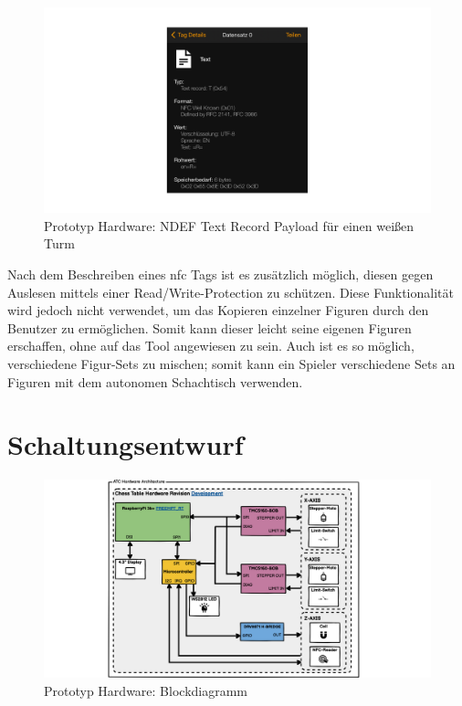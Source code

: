 \begin{figure}
\centering
\includegraphics{images/ndef_record_rook.png}
\caption{Prototyp Hardware: NDEF Text Record Payload für einen weißen
Turm \label{ndef_record_rook}}
\end{figure}

Nach dem Beschreiben eines \gls{nfc} Tags ist es zusätzlich möglich,
diesen gegen Auslesen mittels einer Read/Write-Protection zu schützen.
Diese Funktionalität wird jedoch nicht verwendet, um das Kopieren
einzelner Figuren durch den Benutzer zu ermöglichen. Somit kann dieser
leicht seine eigenen Figuren erschaffen, ohne auf das Tool angewiesen zu
sein. Auch ist es so möglich, verschiedene Figur-Sets zu mischen; somit
kann ein Spieler verschiedene Sets an Figuren mit dem autonomen
Schachtisch verwenden.

\hypertarget{schaltungsentwurf}{%
\section{Schaltungsentwurf}\label{schaltungsentwurf}}

\begin{figure}
\centering
\includegraphics{images/ATC_Hardware_Architecture_DK.png}
\caption{Prototyp Hardware: Blockdiagramm
\label{ATC_Hardware_Architecture_DK}}
\end{figure}

